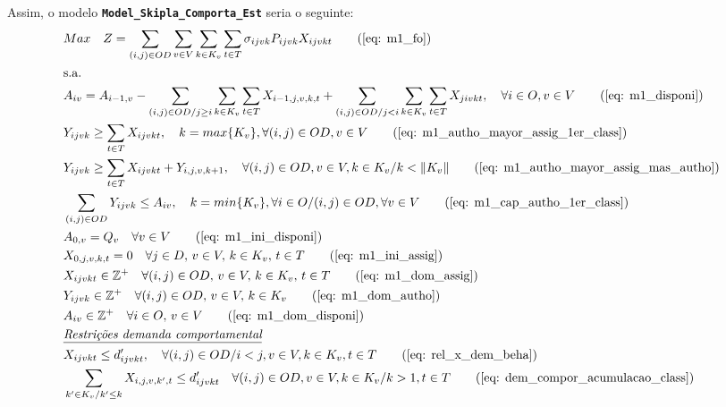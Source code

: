 Assim, o modelo \textbf{ \texttt{Model\_Skipla\_Comporta\_Est}} seria o seguinte:
\allowdisplaybreaks
\begin{align}
	& Max \quad Z = \sum_{(i,j)\in OD} \sum_{v\in V} \sum_{k\in K_v} \sum_{t\in T} \sigma_{ijvk} P_{ijvk} X_{ijvkt}     \tag{\ref{eq: m1_fo}}   \\
	& \text{s.a.}  \notag \\
	& A_{iv} = A_{i-1,v} - \sum_{(i,j) \in OD/j \geq i} \sum_{k\in K_v}\sum_{t\in T}X_{i-1,j,v,k,t} + \sum_{(i,j) \in OD/j<i} \sum_{k\in K_v}\sum_{t\in T}X_{jivkt}, \quad \forall i \in O, v \in V   \tag{\ref{eq: m1_disponi}} \\
	& Y_{ijvk} \geq  \sum_{t \in T} X_{ijvkt},  \quad k = max\{K_v\}, \forall(i,j) \in OD ,v \in V     \tag{\ref{eq: m1_autho_mayor_assig_1er_class}} \\
	& Y_{ijvk} \geq  \sum_{t \in T} X_{ijvkt} + Y_{i,j,v,k + 1} , \quad \forall(i,j) \in OD, v \in V, k \in K_v / k < \lVert K_v \rVert   \tag{\ref{eq: m1_autho_mayor_assig_mas_autho}} \\
	& \sum_{(i,j) \in OD} Y_{ijvk} \leq A_{iv}, \quad  k = min\{K_v\}, \forall i \in O / (i,j) \in OD,   \forall v \in V       \tag{\ref{eq: m1_cap_autho_1er_class}} \\
	& A_{0,v} = Q_v \quad \forall v \in V  \tag{\ref{eq: m1_ini_disponi}} \\ 
	& X_{0,j,v,k,t} = 0 \quad \forall j \in D,\, v \in V,\, k \in K_v,\, t \in T  \tag{\ref{eq: m1_ini_assig}} \\ 
	& X_{ijvkt} \in \mathbb{Z}^+ \quad \forall(i,j) \in OD,\, v \in V,\, k \in K_v,\, t \in T  \tag{\ref{eq: m1_dom_assig}} \\ 
	& Y_{ijvk} \in \mathbb{Z}^+ \quad \forall(i,j) \in OD,\, v \in V,\, k \in K_v  \tag{\ref{eq: m1_dom_autho}} \\ 
	& A_{iv} \in \mathbb{Z}^+ \quad \forall i \in O,\, v \in V  \tag{\ref{eq: m1_dom_disponi}} \\
	& \textit{\underline{Restrições demanda comportamental}}         \notag   \\
	& X_{ijvkt} \leq d'_{ijvkt},  \quad \forall (i,j) \in OD / i < j  ,v \in V, k \in K_v, t\in T   \tag{\ref{eq: rel_x_dem_beha}} \\
	& \sum_{k' \in K_v / k' \leq k}X_{i,j,v,k',t} \leq d'_{ijvkt} \quad \forall (i,j) \in OD, v \in V, k \in K_v / k > 1, t\in T     \tag{\ref{eq: dem_compor_acumulacao_class}} \\

\end{align}
